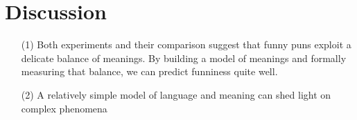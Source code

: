 \documentclass[10pt,letterpaper]{article}
\begin{document}
\section{Discussion}

\begin{itemize}
\item[(1)] Both experiments and their comparison suggest that funny puns exploit a delicate balance of meanings. By building a model of meanings and formally measuring that balance, we can predict funniness quite well.
\item[(2)] A relatively simple model of language and meaning can shed light on complex phenomena
\end{itemize}





\setlength{\bibleftmargin}{.125in}
\setlength{\bibindent}{-\bibleftmargin}

%
\end{document}
